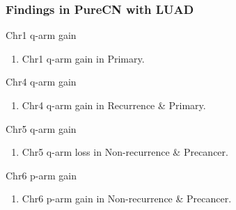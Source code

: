 \documentclass{beamer}
\begin{document}
    \begin{frame}[allowframebreaks]
        \frametitle{Findings in PureCN with LUAD}

        \begin{block}{Chr1 q-arm gain}
            \begin{enumerate}
                \item Chr1 q-arm gain in Primary.
            \end{enumerate}

            \begin{table}
                \caption{CGC Tier1 genes in Chr1 q-arm}
                \resizebox{\linewidth}{!}
                {}
            \end{table}
        \end{block}

        \begin{block}{Chr4 q-arm gain}
            \begin{enumerate}
                \item Chr4 q-arm gain in Recurrence \& Primary.
            \end{enumerate}

            \begin{table}
                \caption{CGC Tier1 genes in Chr4 q-arm}
                \resizebox{\linewidth}{!}
                {}
            \end{table}
        \end{block}

        \begin{block}{Chr5 q-arm gain}
            \begin{enumerate}
                \item Chr5 q-arm loss in Non-recurrence \& Precancer.
            \end{enumerate}

            \begin{table}
                \caption{CGC Tier1 genes in Chr5 q-arm}
                \resizebox{\linewidth}{!}
                {}
            \end{table}
        \end{block}

        \begin{block}{Chr6 p-arm gain}
            \begin{enumerate}
                \item Chr6 p-arm gain in Non-recurrence \& Precancer.
            \end{enumerate}


\end{block}
\end{frame}
\end{document}
